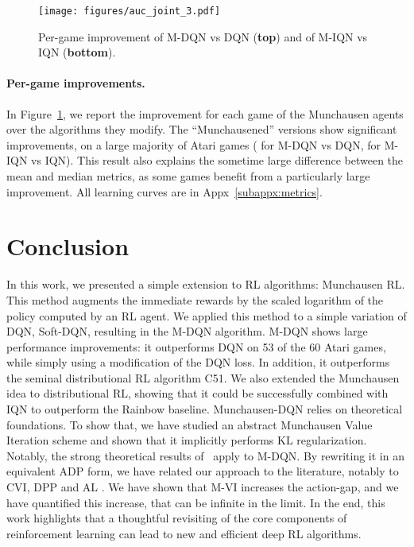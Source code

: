 \documentclass{article}
\begin{document}
\begin{figure}
     \centering
     \texttt{[image: figures/auc\_joint\_3.pdf]}
    \vspace{-4pt}
     \caption{Per-game improvement of M-DQN vs DQN (\textbf{top}) and of M-IQN vs IQN (\textbf{bottom}).}
     \label{fig:aucs}
 \end{figure}
 
\paragraph{Per-game improvements.}
In Figure~\ref{fig:aucs}, we report the improvement for each game of  the Munchausen agents over the algorithms they modify. The ``Munchausened'' versions show significant improvements, on a large majority of Atari games ( for M-DQN vs DQN,  for M-IQN vs IQN). This result also explains the sometime large difference between the mean and median metrics, as some games benefit from a particularly large improvement.
All learning curves are in Appx~\ref{subappx:metrics}.

 
















\section{Conclusion}
In this work, we presented a simple extension to RL algorithms: Munchausen RL. This method augments the immediate rewards by the scaled logarithm of the policy computed by an RL agent. We applied this method to a simple variation of DQN, Soft-DQN, resulting in the M-DQN algorithm. M-DQN shows large performance improvements: it outperforms DQN on 53 of the 60 Atari games, while simply using a modification of the DQN loss. In addition, it outperforms the seminal distributional RL algorithm C51. We also extended the Munchausen idea to distributional RL, showing that it could be successfully combined with IQN to outperform the Rainbow baseline. Munchausen-DQN relies on theoretical foundations.  To show that, we have studied an abstract Munchausen Value Iteration scheme and shown that it implicitly performs KL regularization. Notably, the strong theoretical results of~\cite{vieillard2020leverage} apply to M-DQN. By rewriting it in an equivalent ADP form, we have related our approach to the literature, notably to CVI, DPP and AL . We have shown that M-VI increases the action-gap, and we have quantified this increase, that can be infinite in the limit. In the end, this  work highlights that a thoughtful revisiting of the core components of reinforcement learning can lead to new and efficient deep RL algorithms.
\end{document}
